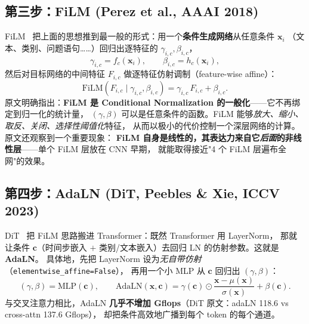 \documentclass[11pt]{ctexart}
\newcommand{\FiLM}{\mathrm{FiLM}}
\newcommand{\AdaLN}{\mathrm{AdaLN}}
\newcommand{\cc}{\mathbf{c}}
\newcommand{\xx}{\mathbf{x}}
\theoremstyle{definition}
\begin{document}
\subsection{第三步：FiLM (Perez et al., AAAI 2018)}
FiLM~\cite{film} 把上面的思想推到最一般的形式：用一个\textbf{条件生成网络}从任意条件 $\xx_i$
（文本、类别、问题语句……）回归出逐特征的 $\gamma_{i,c},\beta_{i,c}$，
\begin{equation}
\gamma_{i,c} = f_c(\xx_i),\qquad \beta_{i,c} = h_c(\xx_i),
\end{equation}
然后对目标网络的中间特征 $F_{i,c}$ 做逐特征仿射调制（feature-wise affine）：
\begin{equation}
\label{eq:film}
\FiLM(F_{i,c}\mid \gamma_{i,c},\beta_{i,c}) = \gamma_{i,c}\, F_{i,c} + \beta_{i,c}.
\end{equation}
原文明确指出：\textbf{FiLM 是 Conditional Normalization 的一般化}——它不再绑定到归一化的统计量，
$(\gamma,\beta)$ 可以是任意条件的函数。FiLM 能够\emph{放大、缩小、取反、关闭、选择性阈值化}特征，
从而以极小的代价控制一个深层网络的计算。原文还观察到一个重要现象：
\textbf{FiLM 自身是线性的，其表达力来自它\emph{后面}的非线性层}——单个 FiLM 层放在 CNN 早期，
就能取得接近"4 个 FiLM 层遍布全网"的效果。

\subsection{第四步：AdaLN (DiT, Peebles \& Xie, ICCV 2023)}
DiT~\cite{dit} 把 FiLM 思路搬进 Transformer：既然 Transformer 用 LayerNorm，
那就让条件 $\cc$（时间步嵌入 $+$ 类别/文本嵌入）去回归 LN 的仿射参数。这就是 \textbf{AdaLN}。
具体地，先把 LayerNorm 设为\emph{无自带仿射}（\texttt{elementwise\_affine=False}），
再用一个小 MLP 从 $\cc$ 回归出 $(\gamma,\beta)$：
\begin{equation}
(\gamma,\beta) = \mathrm{MLP}(\cc),\qquad
\AdaLN(\xx,\cc) = \gamma(\cc)\odot \frac{\xx-\mu(\xx)}{\sigma(\xx)} + \beta(\cc).
\end{equation}
与交叉注意力相比，AdaLN \textbf{几乎不增加 Gflops}（DiT 原文：adaLN 118.6 vs cross-attn 137.6 Gflops），
却把条件高效地广播到每个 token 的每个通道。
\end{document}

